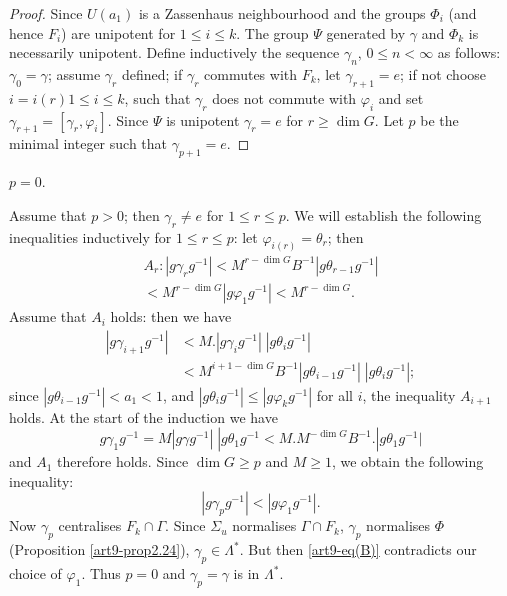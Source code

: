 \begin{proof}
Since $U(a_1)$ is a Zassenhaus neighbourhood and the groups $\Phi_i$ (and hence $F_i$) are unipotent for $1 \leqslant i \leqslant k$. The group $\Psi$ generated by $\gamma$ and $\Phi_k$ is necessarily unipotent. Define inductively the sequence $\gamma_n$, $0 \leqslant n < \infty$ as follows: $\gamma_0 = \gamma$; assume $\gamma_r$ defined; if $\gamma_r$ commutes with $F_k$, let $\gamma_{r+1}=e$; if not choose $i = i (r) 1 \leqslant i \leqslant k$, such that  $\gamma_r$ does not commute with $\varphi_i$ and set $\gamma_{r+1} = [\gamma_r, \varphi_i]$. Since $\Psi$ is unipotent $\gamma_r = e$ for $r \geqslant \dim G$. Let $p$ be the minimal integer such that $\gamma_{p+1} =e$.
\end{proof}

\begin{claim*}
$p=0$.
\end{claim*}

Assume that $p>0$; then $\gamma_r \neq e$ for $1 \leqslant r \leqslant p$. We will establish the following inequalities inductively for $1 \leqslant r \leqslant p$: let $\varphi_{i(r)} = \theta_r$; then 
\begin{gather*}
A_r : |g\gamma_r g^{-1}| < M^{r-\dim G} B^{-1}| g\theta_{r-1} g^{-1} |\\
< M^{r-\dim G} | g\varphi_1 g^{-1} | < M^{r-\dim G}.
\end{gather*}
Assume that $A_i$ holds: then we have
\begin{align*}
|g\gamma_{i+1} g^{-1}|  &< M . | g\gamma_i g^{-1}| \; | g \theta_i g^{-1}|\\
 &<  M^{i+1-\dim G} B^{-1}|g \theta_{i-1} g^{-1}|\; | g \theta_i g^{-1}|;
 \end{align*}
since $|g\theta_{i-1} g^{-1}| < a_1 < 1$, and $|g \theta_i g^{-1}| \leqslant |g \varphi_k g^{-1}|$ for all $i$, the inequality $A_{i+1}$ holds. At the start of the induction we have
$$
g \gamma_1 g^{-1} = M |g \gamma g^{-1}| \; |g \theta_1 g^{-1} < M . M^{-\dim G } B^{-1}. |g\theta_1 g^{-1}|
$$
and $A_1$ therefore holds. Since $\dim G \geqslant p$ and $M \geqslant 1$, we obtain the following inequality:
\begin{equation*} 
|g\gamma_p g^{-1}| < |g\varphi_1 g^{-1}|. \label{art9-eq(B)}
\end{equation*}
Now $\gamma_p$ centralises $F_k \cap \Gamma$. Since $\Sigma_u$ normalises $\Gamma \cap F_k$, $\gamma_p$ normalises $\Phi$ (Proposition \ref{art9-prop2.24}), \ie $\gamma_p \in \Lambda^\ast$. But then \ref{art9-eq(B)} contradicts our choice of $\varphi_1$. Thus $p=0$ and $\gamma_p = \gamma$ is in $\Lambda^\ast$.

